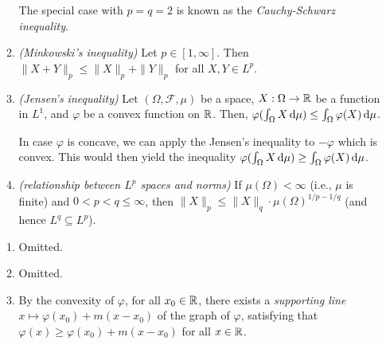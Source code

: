 \begin{enumerate}
\begin{enumerate}
\begin{note}
The special case with \(p=q=2\) is known as the \emph{Cauchy-Schwarz
inequality}.
\end{note}
\item\label{it:minkowski-ineq} \emph{(Minkowski's inequality)} Let \(p\in [1,\infty]\). Then
\(\|X+Y\|_{p}\le \|X\|_{p}+\|Y\|_{p}\) for all \(X,Y\in L^{p}\).
\item\label{it:jensen-ineq} \emph{(Jensen's inequality)} Let
\((\Omega,\mathcal{F},\mu)\) be a  space, \(X:\Omega\to\mathbb{R}\) be
a function in \(L^{1}\), and \(\varphi\) be a convex function
on \(\mathbb{R}\). Then, \(\varphi(\int_{\Omega}^{}X\odif{\mu})\le
\int_{\Omega}^{}\varphi(X)\odif{\mu}\).
\begin{note}
In case \(\varphi\) is concave, we can apply the Jensen's inequality to
\(-\varphi\) which is convex. This would then yield the inequality
\(\varphi(\int_{\Omega}^{}X\odif{\mu})\ge
\int_{\Omega}^{}\varphi(X)\odif{\mu}\).
\end{note}
\item\label{it:lp-sp-norm-relate} \emph{(relationship between \(L^{p}\) spaces
and norms)} If \(\mu(\Omega)<\infty\) (i.e., \(\mu\) is finite) and
\(0<p<q\le\infty\), then \(\|X\|_{p}\le
\|X\|_{q}\cdot \mu(\Omega)^{1/p-1/q}\) (and hence \(L^{q}\subseteq L^{p}\)).

\end{enumerate}
\begin{pf}
\begin{enumerate}
\item Omitted.
\item Omitted.
\item By the convexity of \(\varphi\), for all \(x_0\in\mathbb{R}\), there
exists a \emph{supporting line} \(x\mapsto \varphi(x_0)+m(x-x_0)\) of the graph
of \(\varphi\), satisfying that \(\varphi(x)\ge\varphi(x_0)+m(x-x_0)\) for all
\(x\in\mathbb{R}\).

\begin{center}
\end{center}


\end{enumerate}
\end{pf}
\end{enumerate}
